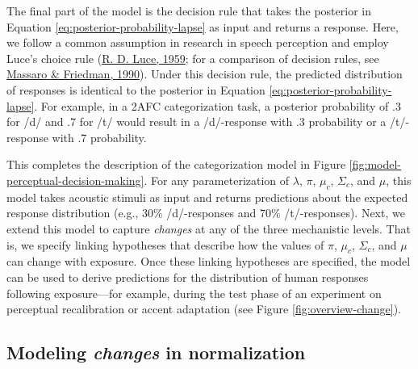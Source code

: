 \documentclass[
  11pt,
  man,floatsintext]{apa6}
\begin{document}
The final part of the model is the decision rule that takes the posterior in Equation \eqref{eq:posterior-probability-lapse} as input and returns a response. Here, we follow a common assumption in research in speech perception and employ Luce's choice rule (\protect\hyperlink{ref-luce1959}{R. D. Luce, 1959}; for a comparison of decision rules, see \protect\hyperlink{ref-massaro-friedman1990}{Massaro \& Friedman, 1990}). Under this decision rule, the predicted distribution of responses is identical to the posterior in Equation \eqref{eq:posterior-probability-lapse}. For example, in a 2AFC categorization task, a posterior probability of .3 for /d/ and .7 for /t/ would result in a /d/-response with .3 probability or a /t/-response with .7 probability.

This completes the description of the categorization model in Figure \ref{fig:model-perceptual-decision-making}. For any parameterization of \(\lambda\), \(\pi\), \(\mu_c\), \(\Sigma_c\), and \(\mu\), this model takes acoustic stimuli as input and returns predictions about the expected response distribution (e.g., 30\% /d/-responses and 70\% /t/-responses). Next, we extend this model to capture \emph{changes} at any of the three mechanistic levels. That is, we specify linking hypotheses that describe how the values of \(\pi\), \(\mu_c\), \(\Sigma_c\), and \(\mu\) can change with exposure. Once these linking hypotheses are specified, the model can be used to derive predictions for the distribution of human responses following exposure---for example, during the test phase of an experiment on perceptual recalibration or accent adaptation (see Figure \ref{fig:overview-change}).

\hypertarget{sec:change-normalization}{%
\subsection{\texorpdfstring{Modeling \emph{changes} in normalization}{Modeling changes in normalization}}\label{sec:change-normalization}}
\end{document}
